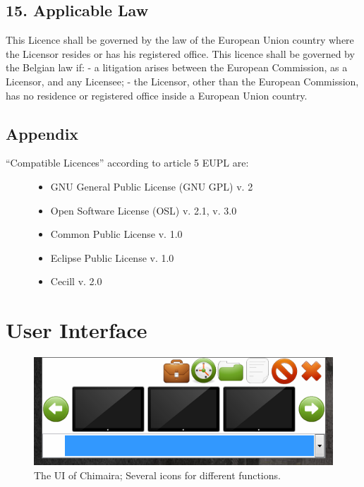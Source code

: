 \documentclass[letterpaper,10pt,english]{sphinxmanual}
\begin{document}
\section{15. Applicable Law}
\label{license:applicable-law}
This Licence shall be governed by the law of the European Union country where the
Licensor resides or has his registered office.
This licence shall be governed by the Belgian law if:
- a litigation arises between the European Commission, as a Licensor, and any Licensee;
- the Licensor, other than the European Commission, has no residence or registered office inside a European Union country.


\section{Appendix}
\label{license:appendix}\begin{description}
\item[{“Compatible Licences” according to article 5 EUPL are:}] \leavevmode\begin{itemize}
\item {} 
GNU General Public License (GNU GPL) v. 2

\item {} 
Open Software License (OSL) v. 2.1, v. 3.0

\item {} 
Common Public License v. 1.0

\item {} 
Eclipse Public License v. 1.0

\item {} 
Cecill v. 2.0

\end{itemize}

\end{description}


\chapter{User Interface}
\label{ui::doc}\label{ui:user-interface}\begin{figure}[htbp]
\centering
\capstart

\includegraphics{screencap.png}
\caption{The UI of Chimaira; Several icons for different functions.}\end{figure}
\end{document}
